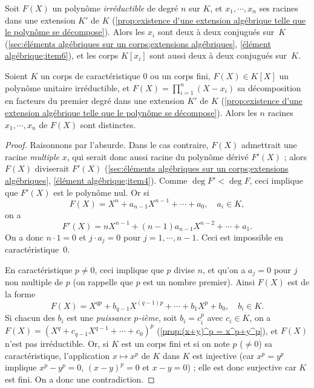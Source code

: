 \documentclass[11pt, %
  title in boldface,
  theorem in new line,
  theorem numbering = section,
  number theorems separately,
  simple name,
]{beaulivre}
\begin{document}
    \begin{example}
        Soit \( F(X) \) un polynôme \emph{irréductible} de degré \( n \) sur \( K \), et \( x_1, \cdots, x_n \) ses racines dans une extension \( K' \) de \( K \) (\cref{prop:existence d'une extension algébrique telle que le polynôme se décompose}). Alors les \( x_i \) sont deux à deux conjugués sur~\( K \) (\cref{sec:éléments algébriques sur un corps;extensions algébriques}, \ref{élément algébrique;item6}), et les corps \( K[x_i] \) sont aussi deux à deux conjugués sur~\( K \).
    \end{example}

    \begin{lemma}\label{lem:racines conjugués sont distinctes}
        Soient \( K \) un corps de caractéristique \( 0 \) ou un corps fini, \( F(X) \in K[X] \) un polynôme unitaire irréductible, et \( F(X) = \prod_{i = 1}^n (X-x_i) \) sa décomposition en facteurs du premier degré dans une extension \( K' \) de \( K \) (\cref{prop:existence d'une extension algébrique telle que le polynôme se décompose}). Alors les \( n \) racines \( x_1, \cdots, x_n \) de \( F(X) \) sont distinctes.
    \end{lemma}
    \begin{proof}
        Raisonnons par l'absurde. Dans le cas contraire, \( F(X) \) admettrait une racine \emph{multiple} \( x \), qui serait donc aussi racine du polynôme dérivé \( F'(X) \) ; alors \( F(X) \) diviserait \( F'(X) \) (\cref{sec:éléments algébriques sur un corps;extensions algébriques}, \ref{élément algébrique;item4}). Comme \( \deg F' < \deg F \), ceci implique que \( F'(X) \) est le polynôme nul. Or si
        \[
            F(X) = X^n + a_{n-1} X^{n-1} + \cdots + a_0, \quad a_i \in K,
        \]
        on a
        \[
            F'(X) = n X^{n-1} + (n-1) a_{n-1} X^{n-2} + \cdots + a_1.
        \]
        On a donc \( n \cdot 1 = 0 \) et \( j \cdot a_j = 0 \) pour \( j = 1, \cdots, n-1 \). Ceci est impossible en caractéristique~\( 0 \).

        En caractéristique \( p \neq 0 \), ceci implique que \( p \) divise \( n \), et qu'on a \( a_j = 0 \) pour \( j \) non multiple de \( p \) (on rappelle que \( p \) est un nombre premier). Ainsi \( F(X) \) est de la forme
        \[
            F(X) = X^{q p} + b_{q-1} X^{(q-1) p} + \cdots + b_1 X^p + b_0, \quad b_i \in K.
        \]
        Si chacun des \( b_i \) est une \emph{puissance \( p \)‑ième}, soit \( b_i = c_i^p \) avec \( c_i \in K \), on a \( F(X) = (X^q + c_{q-1} X^{q-1} + \cdots + c_0)^p \) (\cref{prop:(x+y)^p = x^p+y^p}), et \( F(X) \) n'est pas irréductible. Or, si \( K \) est un corps fini et si on note \( p \) (\( \neq 0 \)) sa caractéristique, l'application \( x \mapsto x^p \) de \( K \) dans \( K \) est injective (car \( x^p = y^p \) implique \( x^p - y^p = 0 \), \( (x-y)^p = 0 \) et \( x-y = 0 \)) ; elle est donc surjective car \( K \) est fini. On a donc une contradiction.
    \end{proof}
\end{document}
